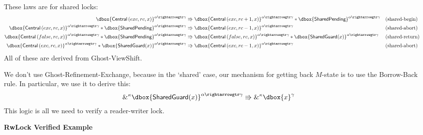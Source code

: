 \documentclass{article}
\newcommand\dboxed[1]{\dbox{\vphantom{t}\ensuremath{#1}}}
\newcommand{\viewshift}{\Rrightarrow}
\newcommand{\borrow}[2]{\textsc{\&}^{#1}#2}
\newcommand{\refines}{\rightarrowgtr}
\begin{document}
These laws are for shared locks:
\begin{align*}
\dboxed{\Central\left(exc, rc, x\right)}^{\alpha \refines \gamma} &\viewshift
  \dboxed{\Central\left(exc, rc+1, x\right)}^{\alpha \refines \gamma} * \dboxed{\SharedPending}^{\alpha \refines \gamma} && \text{(shared-begin)} \\
\dboxed{\Central\left(exc, rc, x\right)}^{\alpha \refines \gamma}  * \dboxed{\SharedPending}^{\alpha \refines \gamma} &\viewshift
  \dboxed{\Central\left(exc, rc-1, x\right)}^{\alpha \refines \gamma} && \text{(shared-abort)} \\
\dboxed{\Central\left(false, rc, x\right)}^{\alpha \refines \gamma} * \dboxed{\SharedPending}^{\alpha \refines \gamma}
    &\viewshift
      \dboxed{\Central\left(false, rc, x\right)}^{\alpha \refines \gamma} * \dboxed{\SharedGuard(x)}^{\alpha \refines \gamma} && \text{(shared-return)}\\
\dboxed{\Central\left(exc, rc, x\right)}^{\alpha \refines \gamma} * \dboxed{\SharedGuard(x)}^{\alpha \refines \gamma}
    &\viewshift
        \dboxed{\Central\left(exc, rc - 1, x\right)}^{\alpha \refines \gamma} && \text{(shared-abort)}
\end{align*}
All of these are derived from Ghost-ViewShift.

We don't use Ghost-Refinement-Exchange, because in the `shared' case, our mechanism for getting back $M$-state is to use the Borrow-Back rule. In particular, we use it to derive this:
\begin{align*}
\borrow{\kappa}{\dboxed{\SharedGuard(x)}^{\alpha \refines \gamma}}
  &\viewshift
    \borrow{\kappa}{\dboxed{x}^{\gamma}}
\end{align*}
This logic is all we need to verify a reader-writer lock.

\textbf{RwLock Verified Example}

\newcommand{\rwlock}{rwlock}
\newcommand{\exc}{exc}
\newcommand{\rc}{rc}
\newcommand{\Pointer}{Pointer}

\newcommand{\AcquireExc}{\text{AcquireExc}}
\newcommand{\AcquireShared}{\text{AcquireShared}}
\newcommand{\ReleaseExc}{\text{ReleaseExc}}
\newcommand{\ReleaseShared}{\text{ReleaseShared}}

\newcommand{\langloop}{\textbf{loop}}
\newcommand{\until}{\textbf{until}}
\newcommand{\langif}{\textbf{if}}
\newcommand{\langthen}{\textbf{then}}
\newcommand{\langelse}{\textbf{else}}
\end{document}
